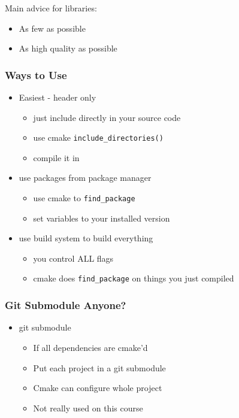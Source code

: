 Main advice for libraries:

\begin{itemize}
\itemsep1pt\parskip0pt
\item
  As few as possible
\item
  As high quality as possible
\end{itemize}

\subsubsection{Ways to Use}\label{ways-to-use}

\begin{itemize}
\itemsep1pt\parskip0pt
\item
  Easiest - header only

  \begin{itemize}
  \itemsep1pt\parskip0pt
  \item
    just include directly in your source code
  \item
    use cmake \texttt{include\_directories()}
  \item
    compile it in
  \end{itemize}
\item
  use packages from package manager

  \begin{itemize}
  \itemsep1pt\parskip0pt
  \item
    use cmake to \texttt{find\_package}
  \item
    set variables to your installed version
  \end{itemize}
\item
  use build system to build everything

  \begin{itemize}
  \itemsep1pt\parskip0pt
  \item
    you control ALL flags
  \item
    cmake does \texttt{find\_package} on things you just compiled
  \end{itemize}
\end{itemize}

\subsubsection{Git Submodule Anyone?}\label{git-submodule-anyone}

\begin{itemize}
\itemsep1pt\parskip0pt
\item
  git submodule

  \begin{itemize}
  \itemsep1pt\parskip0pt
  \item
    If all dependencies are cmake'd
  \item
    Put each project in a git submodule
  \item
    Cmake can configure whole project
  \item
    Not really used on this course
  \end{itemize}
\end{itemize}

